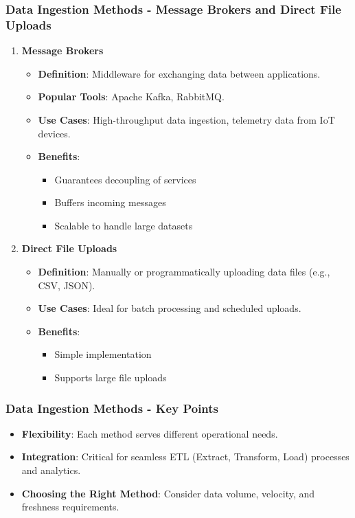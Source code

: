 \documentclass{beamer}
\begin{document}
\begin{frame}[fragile]
    \frametitle{Data Ingestion Methods - Message Brokers and Direct File Uploads}
    \begin{enumerate}
        \item \textbf{Message Brokers}
        \begin{itemize}
            \item \textbf{Definition}: Middleware for exchanging data between applications.
            \item \textbf{Popular Tools}: Apache Kafka, RabbitMQ.
            \item \textbf{Use Cases}: High-throughput data ingestion, telemetry data from IoT devices.
            \item \textbf{Benefits}:
            \begin{itemize}
                \item Guarantees decoupling of services
                \item Buffers incoming messages
                \item Scalable to handle large datasets
            \end{itemize}
        \end{itemize}
        
        \item \textbf{Direct File Uploads}
        \begin{itemize}
            \item \textbf{Definition}: Manually or programmatically uploading data files (e.g., CSV, JSON).
            \item \textbf{Use Cases}: Ideal for batch processing and scheduled uploads.
            \item \textbf{Benefits}:
            \begin{itemize}
                \item Simple implementation
                \item Supports large file uploads
            \end{itemize}
        \end{itemize}
    \end{enumerate}
\end{frame}

\begin{frame}[fragile]
    \frametitle{Data Ingestion Methods - Key Points}
    \begin{itemize}
        \item \textbf{Flexibility}: Each method serves different operational needs.
        \item \textbf{Integration}: Critical for seamless ETL (Extract, Transform, Load) processes and analytics.
        \item \textbf{Choosing the Right Method}: Consider data volume, velocity, and freshness requirements.
    \end{itemize}
\end{frame}
\end{document}
